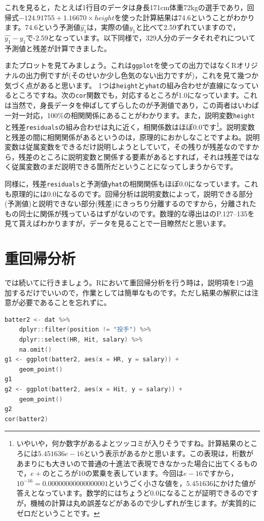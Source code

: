 \documentclass{ltjbook}
\begin{document}
これを見ると，たとえば1行目のデータは身長171cm体重72kgの選手であり，回帰式$-124.91755 + 1.16670 \times height$を使った計算結果は74.6ということがわかります。74.6という予測値$\hat{y_1}$は，実際の値$y_1$と比べて2.59ずれていますので，$\hat{y_1}-y_1$で-2.59となっています。以下同様で，329人分のデータそれぞれについて予測値と残差が計算できました。

またプロットを見てみましょう。これは\texttt{ggplot}を使っての出力ではなくRオリジナルの出力例ですが(そのせいか少し色気のない出力ですが)，これを見て幾つか気づく点があると思います。
1つは\verb|height|と\verb|yhat|の組み合わせが直線になっているところですね。次の\verb|cor|関数でも，対応するところが1.0になっています。これは当然で，身長データを伸ばしてずらしたのが予測値であり，この両者はいわば一対一対応，100\%の相関関係にあることがわかります。また，説明変数\verb|height|と残差\verb|residuals|の組み合わせは丸に近く，相関係数はほぼ0.0です\footnote{いやいや，何か数字があるよとツッコミが入りそうですね。計算結果のところには$5.451636e-16$という表示があるかと思います。この表現は，桁数があまりにも大きいので普通の十進法で表現できなかった場合に出てくるもので，$e+$のところが10の累乗を表しています。今回は$e-16$ですから，$10^{-16}=0.00000000000000001$というごく小さな値を，$5.451636$にかけた値が答えとなっています。数学的にはちょうど$0.0$になることが証明できるのですが，機械の計算は丸め誤差などがあるので少しずれが生じます。が実質的にゼロだということです。}。説明変数と残差の間に相関関係があるというのは，原理的におかしなことですよね。説明変数は従属変数をできるだけ説明しようとしていて，その残りが残差なのですから，残差のところに説明変数と関係する要素があるとすれば，それは残差ではなく従属変数のまだ説明できる箇所だということになってしまうからです。

同様に，残差\verb|residuals|と予測値\verb|yhat|の相関関係もほぼ0.0になっています。これも原理的には$0.0$になるのです。回帰分析は説明変数によって，説明できる部分(予測値)と説明できない部分(残差)にきっちり分離するのですから，分離されたもの同士に関係が残っているはずがないのです。数理的な導出は\textcite{kosugi2018}のP.127--135を見て貰えばわかりますが，データを見ることで一目瞭然だと思います。
\section{重回帰分析}
では続いてに行きましょう。Rにおいて重回帰分析を行う時は，説明項を1つ追加するだけでいいので，作業としては簡単なものです。ただし結果の解釈には注意が必要であることを忘れずに。

\begin{lstlisting}[language=c++,label={code:11_06},caption={重回帰分析のデータを作って可視化}]
batter2 <- dat %>%
    dplyr::filter(position != "投手") %>%
    dplyr::select(HR, Hit, salary) %>%
    na.omit()
g1 <- ggplot(batter2, aes(x = HR, y = salary)) +
    geom_point()
g1
g2 <- ggplot(batter2, aes(x = Hit, y = salary)) +
    geom_point()
g2
cor(batter2)
\end{lstlisting}
\end{document}
